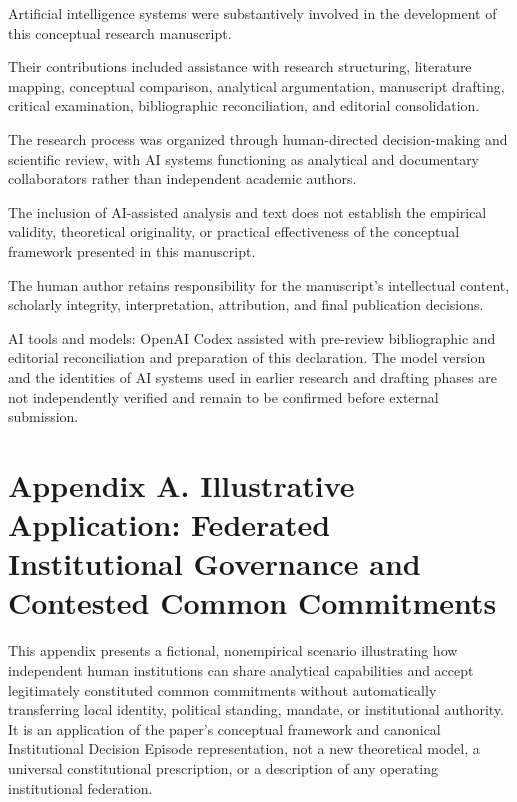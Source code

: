 \documentclass[
  10pt,
]{article}
\newcounter{none} %
\begin{document}
Artificial intelligence systems were substantively involved in the
development of this conceptual research manuscript.

Their contributions included assistance with research structuring,
literature mapping, conceptual comparison, analytical argumentation,
manuscript drafting, critical examination, bibliographic reconciliation,
and editorial consolidation.

The research process was organized through human-directed
decision-making and scientific review, with AI systems functioning as
analytical and documentary collaborators rather than independent
academic authors.

The inclusion of AI-assisted analysis and text does not establish the
empirical validity, theoretical originality, or practical effectiveness
of the conceptual framework presented in this manuscript.

The human author retains responsibility for the manuscript's
intellectual content, scholarly integrity, interpretation, attribution,
and final publication decisions.

AI tools and models: OpenAI Codex assisted with pre-review bibliographic
and editorial reconciliation and preparation of this declaration. The
model version and the identities of AI systems used in earlier research
and drafting phases are not independently verified and remain to be
confirmed before external submission.

{}
\label{references}



\section{Appendix A. Illustrative Application: Federated Institutional
Governance and Contested Common
Commitments}\label{appendix-a.-illustrative-application-federated-institutional-governance-and-contested-common-commitments}

This appendix presents a fictional, nonempirical scenario illustrating
how independent human institutions can share analytical capabilities and
accept legitimately constituted common commitments without automatically
transferring local identity, political standing, mandate, or
institutional authority. It is an application of the paper's conceptual
framework and canonical Institutional Decision Episode representation,
not a new theoretical model, a universal constitutional prescription, or
a description of any operating institutional federation.
\end{document}
